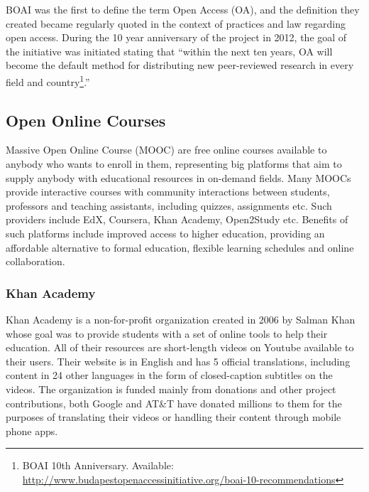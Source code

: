 \documentclass[a4paper]{article}
\begin{document}
\noindent
BOAI was the first to define the term Open Access (OA), and the definition they created became regularly quoted in the context of practices and law regarding open access. During the 10 year anniversary of the project in 2012, the goal of the initiative was initiated stating that ``within the next ten years, OA will become the default method for distributing new peer-reviewed research in every field and country\footnote{BOAI 10th Anniversary. Available: \url{http://www.budapestopenaccessinitiative.org/boai-10-recommendations}}.''

\subsection{Open Online Courses}

Massive Open Online Course (MOOC) are free online courses available to anybody who wants to enroll in them, representing big platforms that aim to supply anybody with educational resources in on-demand fields. Many MOOCs provide interactive courses with community interactions between students, professors and teaching assistants, including quizzes, assignments etc. Such providers include EdX, Coursera, Khan Academy, Open2Study etc. Benefits of such platforms include improved access to higher education, providing an affordable alternative to formal education, flexible learning schedules and online collaboration.  

\subsubsection{Khan Academy}

Khan Academy is a non-for-profit organization created in 2006 by Salman Khan whose goal was to provide students with a set of online tools to help their education. All of their resources are short-length videos on Youtube available to their users. Their website is in English and has 5 official translations, including content in 24 other languages in the form of closed-caption subtitles on the videos. The organization is funded mainly from donations and other project contributions, both Google and AT\&T have donated millions to them for the purposes of translating their videos or handling their content through mobile phone apps. \\
\end{document}
